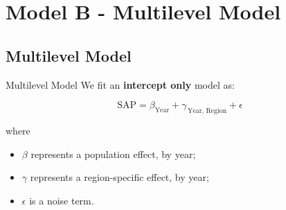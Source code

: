 \section{Model B - Multilevel Model}

\subsection{Multilevel Model}

\begin{frame}{Multilevel Model}
    We fit an \textbf{intercept only} model as:

    \begin{equation*}
        \mathrm{SAP}
            = \beta_{\mathrm{Year}}
            + \gamma_{\, \mathrm{Year}, \, \mathrm{Region}}
            + \epsilon
    \end{equation*}

    where
    
    \begin{itemize}
        \item $\beta$ represents a population effect, by year;
        \item $\gamma$ represents a region-specific effect, by year;
        \item $\epsilon$ is a noise term.
    \end{itemize}
\end{frame}


